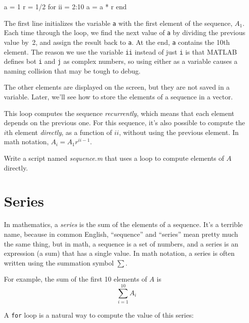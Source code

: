 \begin{code}
a = 1
r = 1/2
for ii = 2:10
    a = a * r
end
\end{code}

The first line initializes the variable \lstinline{a} with the first element of the sequence, $A_1$. Each time through the loop, we find the next value of \lstinline{a}
by dividing the previous value by~2, and assign the result back to \lstinline{a}.
At the end, \lstinline{a} contains the 10th element.  The reason we use the variable \lstinline{ii} instead of just \lstinline{i} is that MATLAB defines bot \lstinline{i} and \lstinline{j} as complex numbers, so using either as a variable causes a naming collision that may be tough to debug.

The other elements are displayed on the screen, but they are not saved in a variable.
Later, we'll see how to store the elements of a sequence in a vector.


This loop computes the sequence \emph{recurrently}, which means that each element depends on the previous one. For this sequence, it's also possible to compute the $i$th element \emph{directly}, as a function of $ii$, without using the previous element. In math notation, $A_i = A_1 r^{ii-1}$.

\begin{ex}
Write a script named \emph{sequence.m} that uses a loop to
compute elements of $A$ \mbox{directly}.
\end{ex}

\section{Series}
\label{series}

In mathematics, a \emph{series} is the sum of the elements of a sequence.  It's a terrible name, because in common English, ``sequence'' and ``series'' mean pretty much the same thing, but in math, a sequence is a set of numbers, and a series is an expression (a sum) that has a single value.  In math notation,  a series is often written using the summation symbol $\sum$.


For example, the sum of the first 10 elements of $A$ is
\begin{equation*}
\sum_{i=1}^{10} A_i
\end{equation*}

A \lstinline{for} loop is a natural way to compute the value of this series:

